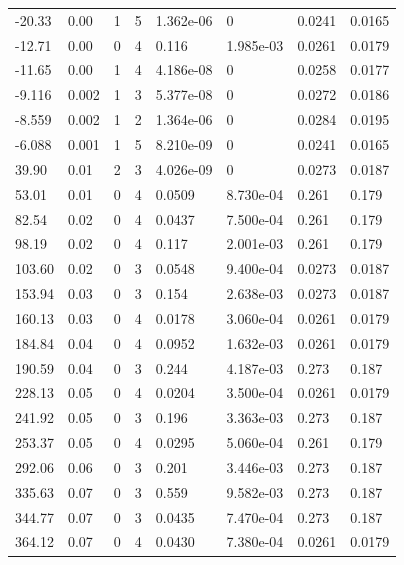 \documentclass[preview]{standalone}
\begin{document}
{{\begin{tabular}{L{1.2cm}C{1.2cm} C{0.3cm}C{0.5cm} C{1.4cm}C{1.4cm} C{1.4cm}C{1.4cm}}
  -20.33  &  0.00  & 1     &  5 &  1.362e-06  & 0  & 0.0241 &  0.0165   \\ 
  -12.71  &  0.00  & 0     &  4 &  0.116  & 1.985e-03  & 0.0261 &  0.0179   \\ 
  -11.65  &  0.00  & 1     &  4 &  4.186e-08  & 0  & 0.0258 &  0.0177   \\ 
  -9.116  &  0.002  & 1     &  3 &  5.377e-08  & 0  & 0.0272 &  0.0186   \\ 
  -8.559  &  0.002  & 1     &  2 &  1.364e-06  & 0  & 0.0284 &  0.0195   \\ 
  -6.088  &  0.001  & 1     &  5 &  8.210e-09  & 0  & 0.0241 &  0.0165   \\ 
  39.90  &  0.01  & 2     &  3 &  4.026e-09  & 0  & 0.0273 &  0.0187   \\ 
  53.01  &  0.01  & 0     &  4 &  0.0509  & 8.730e-04  & 0.261 &  0.179   \\ 
  82.54  &  0.02  & 0     &  4 &  0.0437  & 7.500e-04  & 0.261 &  0.179   \\ 
  98.19  &  0.02  & 0     &  4 &  0.117  & 2.001e-03  & 0.261 &  0.179   \\ 
  103.60  &  0.02  & 0     &  3 &  0.0548  & 9.400e-04  & 0.0273 &  0.0187   \\ 
  153.94  &  0.03  & 0     &  3 &  0.154  & 2.638e-03  & 0.0273 &  0.0187   \\ 
  160.13  &  0.03  & 0     &  4 &  0.0178  & 3.060e-04  & 0.0261 &  0.0179   \\ 
  184.84  &  0.04  & 0     &  4 &  0.0952  & 1.632e-03  & 0.0261 &  0.0179   \\ 
  190.59  &  0.04  & 0     &  3 &  0.244  & 4.187e-03  & 0.273 &  0.187   \\ 
  228.13  &  0.05  & 0     &  4 &  0.0204  & 3.500e-04  & 0.0261 &  0.0179   \\ 
  241.92  &  0.05  & 0     &  3 &  0.196  & 3.363e-03  & 0.273 &  0.187   \\ 
  253.37  &  0.05  & 0     &  4 &  0.0295  & 5.060e-04  & 0.261 &  0.179   \\ 
  292.06  &  0.06  & 0     &  3 &  0.201  & 3.446e-03  & 0.273 &  0.187   \\ 
  335.63  &  0.07  & 0     &  3 &  0.559  & 9.582e-03  & 0.273 &  0.187   \\ 
  344.77  &  0.07  & 0     &  3 &  0.0435  & 7.470e-04  & 0.273 &  0.187   \\ 
  364.12  &  0.07  & 0     &  4 &  0.0430  & 7.380e-04  & 0.0261 &  0.0179   \\ 

\end{tabular}}}
\end{document}
